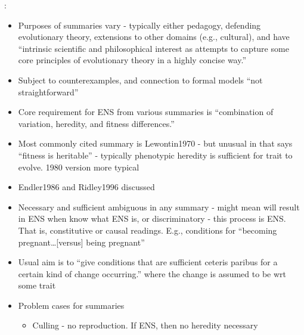 \autocite{Godfrey-Smith2007}:

\begin{itemize}
	\item
	
	Purposes of summaries vary - typically either pedagogy, defending
	evolutionary theory, extensions to other domains (e.g., cultural), and
	have ``intrinsic scientific and philosophical interest as attempts to
	capture some core principles of evolutionary theory in a highly
	concise way.''
	
	\item
	
	Subject to counterexamples, and connection to formal models ``not
	straightforward''
	
	\item
	
	Core requirement for ENS from various summaries is ``combination of
	variation, heredity, and fitness differences.''
	
	\item
	
	Most commonly cited summary is Lewontin1970 - but unusual in that says
	``fitness is heritable'' - typically phenotypic heredity is sufficient
	for trait to evolve. 1980 version more typical
	
	\item
	
	Endler1986 and Ridley1996 discussed
	
	\item
	
	Necessary and sufficient ambiguous in any summary - might mean will
	result in ENS when know what ENS is, or discriminatory - this process
	is ENS. That is, constitutive or causal readings. E.g., conditions for
	``becoming pregnant\ldots{}{[}versus{]} being pregnant''
	
	\item
	
	Usual aim is to ``give conditions that are sufficient ceteris paribus
	for a certain kind of change occurring.'' where the change is assumed
	to be wrt some trait
	
	\item
	
	Problem cases for summaries
	
	
	\begin{itemize}
		\item
		
		Culling - no reproduction. If ENS, then no heredity necessary
		

\end{itemize}
\end{itemize}
